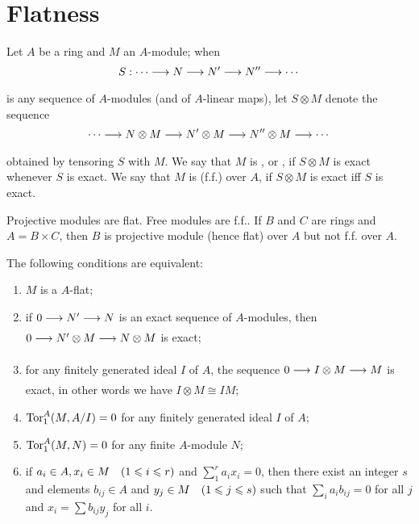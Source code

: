 \documentclass[../main]{subfiles}
\begin{document}
\section{Flatness}\label{sec:03}

\begin{pardefinition}
    Let $A$ be a ring and $M$ an $A$-module; when \[S:\cdots \varrightarrow{} N \varrightarrow{} N' \varrightarrow{} N'' \varrightarrow{} \cdots\] is any sequence of $A$-modules (and of $A$-linear maps), let $S \otimes M$ denote the sequence \[\cdots \varrightarrow{} N \otimes M \varrightarrow{} N' \otimes M \varrightarrow{} N'' \otimes M \varrightarrow{} \cdots\] obtained by tensoring $S$ with $M$. We say that $M$ is , or , if $S\otimes M$ is exact whenever $S$ is exact. We say that $M$ is  (f.f.) over $A$, if $S\otimes M$ is exact iff $S$ is exact.     
\end{pardefinition}

\begin{example} 
    Projective modules are flat. Free modules are f.f.. If $B$ and $C$ are rings and $A = B \times C$, then $B$ is projective module (hence flat) over $A$ but not f.f. over $A$.
\end{example}

\begin{theorem}\label{thm:001}
    The following conditions are equivalent:
    \begin{enumerate} [label={(\arabic*)}]
       \item $M$ is a $A$-flat;
       \item if $0 \varrightarrow{} N' \varrightarrow{} N$ is an exact sequence of $A$-modules, then \newline $0 \varrightarrow{} N' \otimes M \varrightarrow{} N \otimes M$ is exact;
       \item for any finitely generated ideal $I$ of $A$, the sequence $0 \varrightarrow{} I\otimes M \varrightarrow{} M$ is exact, in other words we have $I \otimes M \cong IM$;
       \item $\operatorname{Tor}^A_1 (M, A/ I) = 0$ for any finitely generated ideal $I$ of $A$;
       \item $\operatorname{Tor}^A_1(M,N) = 0$ for any finite $A$-module $N$;
       \item if $a_i \in A, x_i \in M\for{1 \leq i \leq r}$ and $\sum_1^r a_i x_i = 0$, then there exist an integer $s$ and elements $b_{ij} \in A$ and $y_j \in M\for{1 \leq j \leq s}$ such that $\sum_i a_i b_{ij} = 0$ for all $j$ and $x_i = \sum b_{ij}y_j$ for all $i$.
    \end{enumerate}
\end{theorem}
\end{document}
